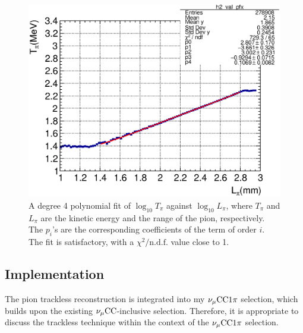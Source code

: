           \begin{figure}[h]
          \centering
          \includegraphics[width=\sgfidwid\textwidth]{figures/sel/pi_len_pi_len_vs_pi_ke_hist2d_al0_true_nokink.eps} 
          \caption{A degree 4 polynomial fit of $\log_{10}{T_\pi}$ against $\log_{10}{L_\pi}$, where $T_\pi$ and $L_\pi$ are the kinetic energy and the range of the pion, respectively. The $p_i$'s are the corresponding coefficients of the term of order $i$. The fit is satisfactory, with a $\chi^2/\textrm{n.d.f.}$ value close to 1.}
          \label{fig:pi-mombr-fit}
          \end{figure}

     \subsection{Implementation}
     \label{sec:tl-imp}
          The pion trackless reconstruction is integrated into my $\nu_{\mu}\textrm{CC}1\pi$ selection, which builds upon the existing $\nu_{\mu}\textrm{CC}$-inclusive selection. 
          Therefore, it is appropriate to discuss the trackless technique within the context of the $\nu_{\mu}\textrm{CC}1\pi$ selection.

